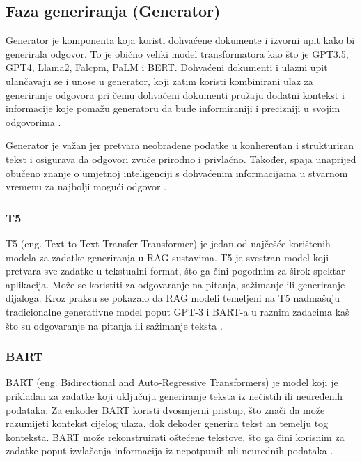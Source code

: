 \documentclass[]{foi}
\begin{document}



\subsection{Faza generiranja (Generator)}

Generator je komponenta koja koristi dohvaćene dokumente i izvorni upit kako bi generirala odgovor. To je obično veliki model transformatora kao što je GPT3.5, GPT4, Llama2, Falcpm, PaLM i BERT.
Dohvaćeni dokumenti i ulazni upit ulančavaju se i unose u generator, koji zatim koristi kombinirani ulaz za generiranje odgovora pri čemu dohvaćeni dokumenti pružaju dodatni kontekst i informacije 
koje pomažu generatoru da bude informiraniji i precizniji u svojim odgovorima \cite{redis2025}. 

Generator je važan jer pretvara neobrađene podatke u konherentan i strukturiran tekst i osigurava da odgovori zvuče prirodno i privlačno. Također, spaja unaprijed obučeno znanje o umjetnoj inteligenciji
s dohvaćenim informacijama u stvarnom vremenu za najbolji mogući odgovor \cite{shaheryar2025}. 

\subsubsection{T5}
T5 (eng. Text-to-Text Transfer Transformer) je jedan od najčešće korištenih modela za zadatke generiranja u RAG sustavima. T5 je svestran model koji pretvara sve zadatke u tekstualni format, što ga čini pogodnim za širok spektar aplikacija.
Može se koristiti za odgovaranje na pitanja, sažimanje ili generiranje dijaloga. Kroz praksu se pokazalo da RAG modeli temeljeni na T5 nadmašuju
tradicionalne generativne model poput GPT-3 i BART-a u raznim zadacima kaš što su odgovaranje na pitanja ili sažimanje teksta \cite{gupta2024rag}.

\subsubsection{BART}
BART (eng. Bidirectional and Auto-Regressive Transformers) je model koji je prikladan za zadatke koji uključuju generiranje teksta 
iz nečistih ili neuređenih podataka. Za enkoder BART koristi dvosmjerni pristup, što znači da može razumijeti kontekst cijelog ulaza,
dok dekoder generira tekst an temelju tog konteksta. BART može rekonstruirati oštećene tekstove, što ga čini korisnim za zadatke poput
izvlačenja informacija iz nepotpunih uli neurednih podataka \cite{gupta2024rag}. 
\end{document}
